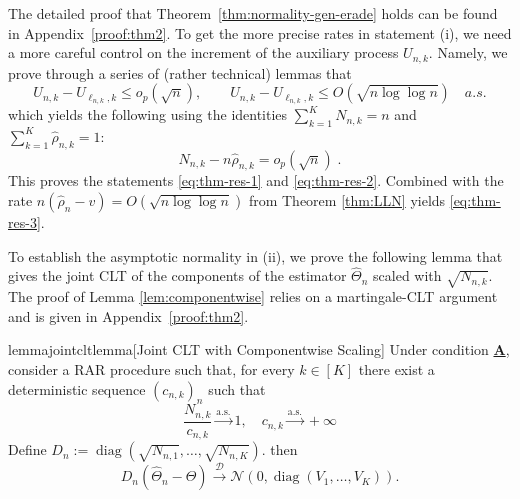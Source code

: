 	\smallskip

	The detailed proof that Theorem~\ref{thm:normality-gen-erade} holds can be found in Appendix~\ref{proof:thm2}. To get the more precise rates in statement (i), we need a more careful control on the increment of the auxiliary process $U_{n,k}$. Namely, we prove through a series of (rather technical) lemmas that
	\[
	U_{n,k}-U_{\ell_{n,k},k}\leq o_p(\sqrt n),
	\qquad
	U_{n,k}-U_{\ell_{n,k},k}\leq O(\sqrt{n\log\log n}) \quad a.s.
	\]
	which yields the following using the identities $\sum_{k=1}^K N_{n,k}=n$ and $\sum_{k=1}^K \hat\rho_{n,k}=1$:
	\[
	N_{n,k}-n\hat\rho_{n,k}=o_p(\sqrt n)\;.
	\]
    This proves the statements \eqref{eq:thm-res-1} and \eqref{eq:thm-res-2}. 	Combined with the rate \(n(\hat\rho_n-v)=O(\sqrt{n\log\log n})\)
	from Theorem \ref{thm:LLN} yields \eqref{eq:thm-res-3}.
	
	To establish the asymptotic normality in (ii), we prove the following lemma that gives the joint CLT of the components of the estimator \(\hat{\Theta}_n\) scaled with \(\sqrt{N_{n,k}}\). The proof of Lemma \ref{lem:componentwise} relies on a martingale-CLT argument and is given in Appendix~\ref{proof:thm2}.

		

	{\color{revisiongreen} \begin{restatable}{lemma}{jointcltlemma}[Joint CLT with Componentwise Scaling]\label{lem:componentwise} 
			Under condition \hyperlink{CA}{\textbf{A}}, consider a RAR procedure such that, for every
			$k\in[K]$ there exist a deterministic sequence \((c_{n,k})_n\) such that
			\[
			\frac{N_{n,k}}{c_{n,k}}\xrightarrow{\mathrm{a.s.}}1, \quad c_{n,k}\xrightarrow{\mathrm{a.s.}}+\infty
			\]
			Define
			\(
			D_n:=\operatorname{diag}
			\left(\sqrt{N_{n,1}},\ldots,\sqrt{N_{n,K}}\right).
			\) then
			\[
			D_n(\widehat\Theta_n-\Theta)
			\xrightarrow{\mathcal D}
			\mathcal N\!\left(
			0,\operatorname{diag}(V_1,\ldots,V_K)
			\right).
			\]
	\end{restatable}}	
		
